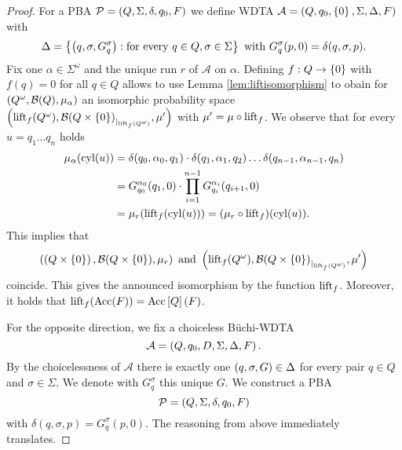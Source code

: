 \begin{proof}
  For a \ac{PBA} $\mathcal{P} = \left(Q, \Sigma, \delta, q_{0}, F\right)$ we define
  \ac{WDTA} $\mathcal{A} = \left(Q, q_{0}, \left\{0\right\}, \Sigma, \Delta, F\right)$ with
  \begin{equation*}
    \Delta = \left\{
      \left(q,\sigma,G_{q}^{\sigma}\right):\text{for every }q\in Q,\sigma\in\Sigma
    \right\}\text{ with }G_{q}^{\sigma}(p, 0) = \delta(q,\sigma,p).
  \end{equation*}
  Fix one $\alpha\in\Sigma^{\omega}$ and the unique run $r$ of $\mathcal{A}$ on
  $\alpha$. Defining $f:Q\rightarrow\left\{0\right\}$ with $f(q) = 0$ for all $q\in Q$
  allows to use Lemma \ref{lem:liftisomorphism} to obain for
  $\left(Q^{\omega}, \mathcal{B}(Q), \mu_{\alpha}\right)$ an isomorphic
  probability space $\left(\operatorname{lift}_{f}(Q^{\omega}), 
  {\mathcal{B}(Q\times\left\{0\right\})}_{|_{\operatorname{lift}_{f}(Q^{\omega})}}, \mu'\right)$ with
  $\mu' = \mu\circ\operatorname{lift}_{f}$. We observe that for every $u = q_{1}\dots q_{n}$
  holds
  \begin{align*}
    \mu_{\alpha}(\operatorname{cyl}(u)) &=\delta(q_{0},\alpha_{0},q_{1})\cdot
      \delta(q_{1},\alpha_{1},q_{2})\dots\delta(q_{n-1},\alpha_{n-1},q_{n})\\
    &= G_{q_{0}}^{\alpha_{0}}(q_{1},0)\cdot
      \prod\limits_{i=1}^{n-1}G_{q_{i}}^{\alpha_{i}}(q_{i+1}, 0)\\
    &= \mu_{r}(\operatorname{lift}_{f}(\operatorname{cyl}(u))) = (\mu_{r}\circ \operatorname{lift}_{f})(\operatorname{cyl}(u)).
  \end{align*}
  This implies that 
  \begin{equation*}
    \left(\left(Q\times\left\{0\right\}\right), \mathcal{B}(Q\times\left\{0\right\}), \mu_{r}\right)
    \text{ and }
    \left(\operatorname{lift}_{f}(Q^{\omega}), 
    {\mathcal{B}(Q\times\left\{0\right\})}_{|_{\operatorname{lift}_{f}(Q^{\omega})}}, \mu'\right)
  \end{equation*}
  coincide. This gives the announced isomorphism by the function $\operatorname{lift}_{f}$.
  Moreover, it holds that $\operatorname{lift}_{f}(\operatorname{Acc}(F)) = \operatorname{Acc}\left[Q\right](F)$.

  For the opposite direction, we fix a choiceless Büchi-\ac{WDTA}
  \begin{equation*}
    \mathcal{A} = \left(Q, q_{0}, D , \Sigma, \Delta, F\right).
  \end{equation*}
  By the choicelessness of $\mathcal{A}$ there is exactly one 
  $\left(q,\sigma, G\right)\in\Delta$ for every pair $q\in Q$ and $\sigma\in\Sigma$.
  We denote with $G_{q}^{\sigma}$ this unique $G$. We construct a \ac{PBA}
  \begin{equation*}
    \mathcal{P} = \left(Q, \Sigma, \delta, q_{0}, F\right)
  \end{equation*}
  with $\delta(q,\sigma, p) = G_{q}^{\sigma}(p, 0)$. The reasoning from above
  immediately translates.
\end{proof}

